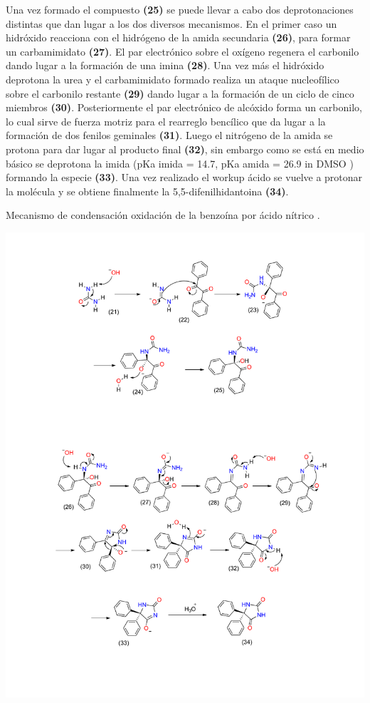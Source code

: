\documentclass[fleqn,10pt]{SelfArx}
\begin{document}
Una vez formado el compuesto \textbf{(25)} se puede llevar a cabo dos deprotonaciones distintas que dan lugar a los dos diversos mecanismos. En el primer caso un hidróxido reacciona con el hidrógeno de la amida secundaria \cite{dunnavant1956}\cite{hayward1983} \textbf{(26)}, para formar un carbamimidato \textbf{(27)}. El par electrónico sobre el oxígeno regenera el carbonilo dando lugar a la formación de una imina \textbf{(28)}. Una vez más el hidróxido deprotona la urea y el carbamimidato formado realiza un ataque nucleofílico sobre el carbonilo restante \textbf{(29)} dando lugar a la formación de un ciclo de cinco miembros \textbf{(30)}. Posteriormente el par electrónico de alcóxido forma un carbonilo, lo cual sirve de fuerza motriz para el rearreglo bencílico que da lugar a la formación de dos fenilos geminales \textbf{(31)}. Luego el nitrógeno de la amida se protona para dar lugar al producto final \textbf{(32)}, sin embargo como se está en medio básico se deprotona la imida (pKa imida = 14.7, pKa amida = 26.9 in DMSO \cite{bordwellpkatableacidityindmso}) formando la especie \textbf{(33)}. Una vez realizado el workup ácido se vuelve a protonar la molécula y se obtiene finalmente la 5,5-difenilhidantoina \textbf{(34)}.
\begin{scheme}[h]
	\centering
	\caption{Mecanismo de condensaci\'on oxidaci\'on de la benzo\'ina por \'acido n\'itrico \cite{pavia2010}.}
	\includegraphics[width=\linewidth]{structures/dilantinesquema2.pdf}
\end{scheme}
\end{document}

